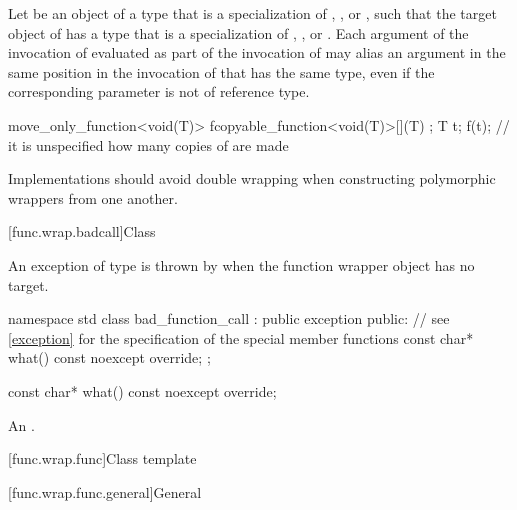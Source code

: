 \pnum
Let  be an object of a type that is a specialization of
, , or ,
such that the target object  of  has a type that
is a specialization of
, , or .
Each argument of the
invocation of  evaluated as part of the invocation of 
may alias an argument in the same position in the invocation of  that
has the same type, even if the corresponding parameter is not of reference type.
\begin{example}
\begin{codeblock}
move_only_function<void(T)> f{copyable_function<void(T)>{[](T) {}}};
T t;
f(t);                               // it is unspecified how many copies of  are made
\end{codeblock}
\end{example}

\pnum
\recommended
Implementations should avoid double wrapping when
constructing polymorphic wrappers from one another.

[func.wrap.badcall]{Class }%
%

\pnum
An exception of type  is thrown by
when the function wrapper object has no target.

\begin{codeblock}
namespace std {
  class bad_function_call : public exception {
  public:
    // see \ref{exception} for the specification of the special member functions
    const char* what() const noexcept override;
  };
}
\end{codeblock}

%
\begin{itemdecl}
const char* what() const noexcept override;
\end{itemdecl}

\begin{itemdescr}
\pnum
\returns
An
 \ntbs{}.
\end{itemdescr}

[func.wrap.func]{Class template }

[func.wrap.func.general]{General}
%

